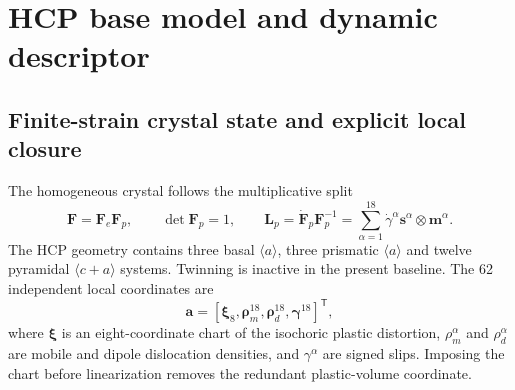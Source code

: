 \section{HCP base model and dynamic descriptor}
\label{sec:base_model_dynamic}

\subsection{Finite-strain crystal state and explicit local closure}

The homogeneous crystal follows the multiplicative split
\begin{equation}
 \boldsymbol F=\boldsymbol F_e\boldsymbol F_p,
 \qquad \det\boldsymbol F_p=1,
 \qquad
 \boldsymbol L_p=\dot{\boldsymbol F}_p\boldsymbol F_p^{-1}
 =\sum_{\alpha=1}^{18}\dot\gamma^\alpha
 \boldsymbol s^\alpha\otimes\boldsymbol m^\alpha .
 \label{eq:dyn_multiplicative_split}
\end{equation}
The HCP geometry contains three basal $\langle a\rangle$, three prismatic $\langle a\rangle$ and twelve pyramidal $\langle c+a\rangle$ systems. Twinning is inactive in the present baseline. The 62 independent local coordinates are
\begin{equation}
 \boldsymbol a=
 [\boldsymbol\xi_8,\boldsymbol\rho_m^{18},
  \boldsymbol\rho_d^{18},\boldsymbol\gamma^{18}]^{\mathsf T},
 \label{eq:dyn_local_state}
\end{equation}
where $\boldsymbol\xi$ is an eight-coordinate chart of the isochoric plastic distortion, $\rho_m^\alpha$ and $\rho_d^\alpha$ are mobile and dipole dislocation densities, and $\gamma^\alpha$ are signed slips. Imposing the chart before linearization removes the redundant plastic-volume coordinate.

